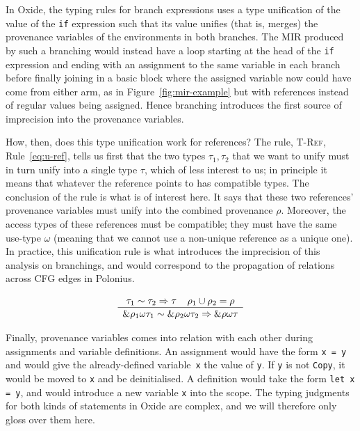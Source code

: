 \documentclass[11pt,a4paper,twoside,openany,draft]{report}
\newcommand{\InRust}[1]{\texttt{#1}}
\newcommand{\ntyperule}[2]{\begin{array}{c}#1\\\hline\raisebox{1pt}{\strut}#2\end{array}}
\begin{document}
In Oxide, the typing rules for branch expressions uses a type unification of the
value of the \InRust{if} expression such that its value unifies (that is,
merges) the provenance variables of the environments in both branches. The MIR
produced by such a branching would instead have a loop starting at the head of
the \InRust{if} expression and ending with an assignment to the same variable in
each branch before finally joining in a basic block where the assigned variable
now could have come from either arm, as in Figure~\ref{fig:mir-example} but with
references instead of regular values being assigned. Hence branching introduces
the first source of imprecision into the provenance variables.

How, then, does this type unification work for references? The rule,
\textsc{T-Ref}, Rule~\eqref{eq:u-ref}, tells us first that the two types
$\tau_1, \tau_2$ that we want to unify must in turn unify into a single type
$\tau$, which of less interest to us; in principle it means that whatever the
reference points to has compatible types. The conclusion of the rule is what is
of interest here. It says that these two references' provenance variables must
unify into the combined provenance $\rho$. Moreover, the access types of these
references must be compatible; they must have the same use-type $\omega$
(meaning that we cannot use a non-unique reference as a unique one). In
practice, this unification rule is what introduces the imprecision of this
analysis on branchings, and would correspond to the propagation of relations
across CFG edges in Polonius.

\begin{equation}\label{eq:u-ref}
  \ntyperule{
    \tau_1 \sim \tau_2 \Rightarrow \tau \:\:\:\:\: \rho_1 \cup \rho_2 = \rho}
  {
    \&\rho_1 \omega \tau_1 \sim \& \rho_2  \omega \tau_2 \Rightarrow \&\rho \omega \tau
  }
\end{equation}

Finally, provenance variables comes into relation with each other during
assignments and variable definitions. An assignment would have the form
\InRust{x = y} and would give the already-defined variable~\InRust{x} the value
of \InRust{y}. If \InRust{y} is not \InRust{Copy}, it would be moved to
\InRust{x} and be deinitialised. A definition would take the form \InRust{let x
  = y}, and would introduce a new variable \InRust{x} into the scope. The typing
judgments for both kinds of statements in Oxide are complex, and we will
therefore only gloss over them here.
\end{document}
